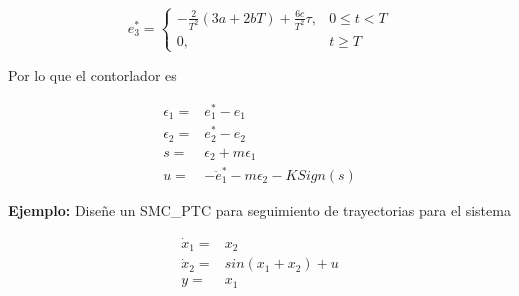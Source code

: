 \begin{equation*}
    e_3^* = \begin{cases}
			-\frac{2}{T^2}(3a+2bT)+\frac{6c}{T^2}\tau, & 0 \leq t < T\\
            0, & t \geq T
		 \end{cases}
\end{equation*}

Por lo que el contorlador es

\begin{equation*}
    \begin{aligned}
        \epsilon_1=&e_1^*-e_1\\
        \epsilon_2=&e_2^*-e_2\\
        s = & \epsilon_2+m\epsilon_1\\
        u = & -\ddot{e}_1^*-m\epsilon_2-KSign(s)
    \end{aligned}
\end{equation*}

\textbf{Ejemplo:} Diseñe un SMC\_PTC para seguimiento de trayectorias para el sistema

\begin{equation*}
    \begin{aligned}
        \dot{x}_1=&x_2\\
        \dot{x}_2=&sin(x_1+x_2)+u\\
        y=&x_1
    \end{aligned}
\end{equation*}
